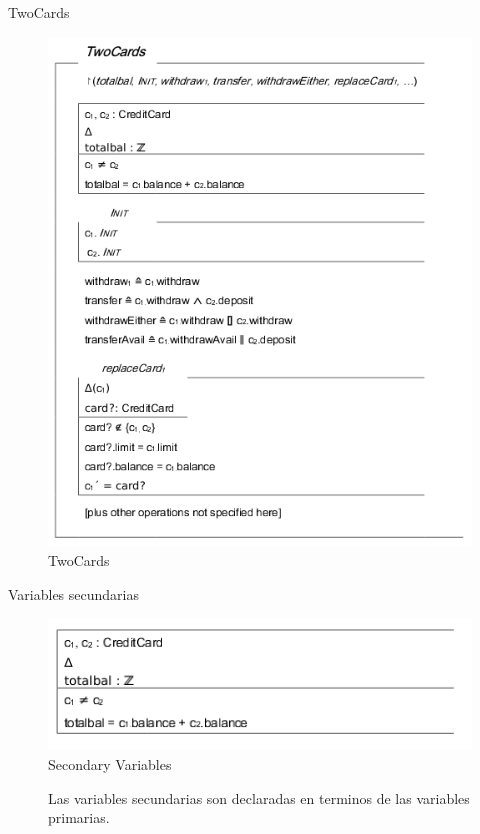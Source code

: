 \documentclass{beamer}
\begin{document}
\begin{frame}{TwoCards}
  \begin{figure}
      \centering
      \includegraphics[scale=0.3]{Z7.png}
      \caption{TwoCards}
      \label{Clase TwoCards}
  \end{figure}
\end{frame}

\begin{frame}{Variables secundarias}
  \begin{figure}
      \centering
      \includegraphics[scale=0.5]{Z8.png}
      \caption{Secondary Variables}
      \label{Variables secundarias}
  \end{figure}
  \begin{figure}
  \item Las variables secundarias son declaradas en terminos de las variables primarias.
  \end{figure}
\end{frame}
\end{document}
